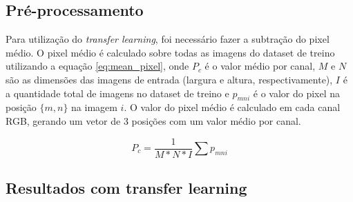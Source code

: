 \documentclass[conference]{IEEEtran}
\begin{document}
  \subsection{Pré-processamento}


  
  
  Para utilização do \textit{transfer learning}, foi necessário fazer a subtração do pixel médio. O pixel médio é calculado sobre todas as imagens do dataset de treino utilizando a equação \ref{eq:mean_pixel}, onde $P_c$ é o valor médio por canal, $M$ e $N$ são as dimensões das imagens de entrada (largura e altura, respectivamente), $I$ é a quantidade total de imagens no dataset de treino e $p_{mni}$ é o valor do pixel na posição $\{m,n\}$ na imagem $i$. O valor do pixel médio é calculado em cada canal RGB, gerando um vetor de 3 posições com um valor médio por canal.


  \begin{equation}
    P_c = \frac{1}{M * N * I} \sum p_{mni}
    \label{eq:mean_pixel}
  \end{equation}



  \subsection{Resultados com transfer learning}

\end{document}
